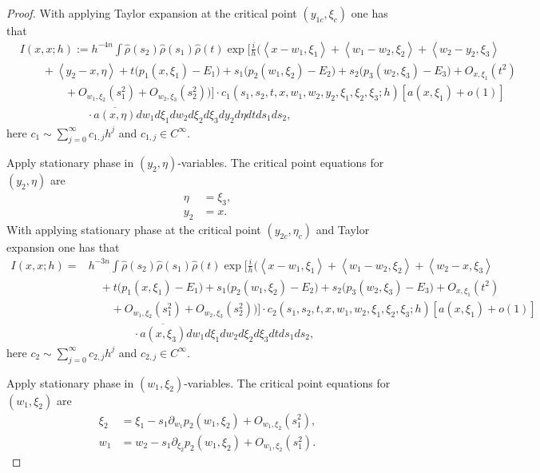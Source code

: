 \documentclass[10pt,a4paper]{amsart}
\begin{document}
\begin{proof}
With applying Taylor expansion at the critical point $(y_{1c}, \xi_{c})$ one has that
\begin{align}
&I (x,x; h):=h^{-4n}\int \hat{\rho}(s_2)\hat{\rho}(s_1)\hat{\rho}(t)  \exp\Big[\frac{i}h\Big(\left<x-w_1, \xi_1\right>+\left<w_1-w_2,\xi_2\right>+\left<w_2-y_2,\xi_3\right> \nonumber \\
&\qquad+\left<y_2-x, \eta\right> +t(p_1(x,\xi_1)-E_1\big)+ s_1\big(p_2(w_1,\xi_2)-E_2\big) +s_2\big( p_3(w_2,\xi_3)-E_3 \big)+O_{x,\xi_1}(t^2) \nonumber\\
&\qquad\qquad + O_{w_1,\xi_2}(s_1^2)+O_{w_2,\xi_3}(s_2^2) \Big)\Big]\cdot c_1(s_1, s_2,t,x, w_1,w_2,y_2,\xi_1,\xi_2,\xi_3;h)[a(x, \xi_1)+o(1)]  \nonumber\\
&\qquad\qquad\qquad \cdot \overline{a(x, \eta)} dw_1 d\xi_1 dw_2 d\xi_2 d\xi_3 dy_2 d\eta dt ds_1 ds_2, 
\end{align}
here $c_1\sim \sum_{j=0}^\infty c_{1,j} h^j$ and $c_{1,j}\in C^\infty$.

Apply stationary phase in $(y_2, \eta)$-variables. The critical point equations for $(y_2, \eta)$ are
\begin{align}
\eta&=\xi_3, \\
y_2&=x.
\end{align}
With applying stationary phase at the critical point $(y_{2c}, \eta_{c})$ and Taylor expansion one has that
\begin{align*}
I (x,x; h)=&h^{-3n}\int \hat{\rho}(s_2)\hat{\rho}(s_1)\hat{\rho}(t)  \exp\Big[\frac{i}h\Big(\left<x-w_1, \xi_1\right>+\left<w_1-w_2,\xi_2\right>+\left<w_2-x,\xi_3\right> \nonumber \\
&\quad +t(p_1(x,\xi_1)-E_1\big)+ s_1\big(p_2(w_1,\xi_2)-E_2\big) +s_2\big( p_3(w_2,\xi_3)-E_3 \big)+O_{x,\xi_1}(t^2) \nonumber\\
&\quad\quad + O_{w_1,\xi_2}(s_1^2)+O_{w_2,\xi_3}(s_2^2) \Big)\Big]\cdot c_2(s_1, s_2,t,x, w_1,w_2,\xi_1,\xi_2,\xi_3;h) [a(x, \xi_1)+o(1)]  \nonumber\\
&\quad\qquad\quad \cdot \overline{a(x, \xi_3)} dw_1 d\xi_1 dw_2 d\xi_2 d\xi_3 dt ds_1 ds_2, 
\end{align*}
here $c_2\sim \sum_{j=0}^\infty c_{2,j} h^j$ and $c_{2,j}\in C^\infty$.

Apply stationary phase in $(w_1, \xi_2)$-variables. The critical point equations for $(w_1,\xi_2)$ are
\begin{align}
\xi_2&=\xi_1-s_1\partial_{w_1} p_2(w_1,\xi_2)+ O_{w_1,\xi_2}(s_1^2), \\
w_1&=w_2-s_1\partial_{\xi_2} p_2(w_1,\xi_2)+ O_{w_1, \xi_2}(s_1^2).
\end{align}


\end{proof}
\end{document}
